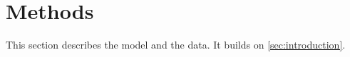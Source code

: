 \section{Methods}
\label{sec:methods}

This section describes the model and the data.
It builds on \autoref{sec:introduction}.



